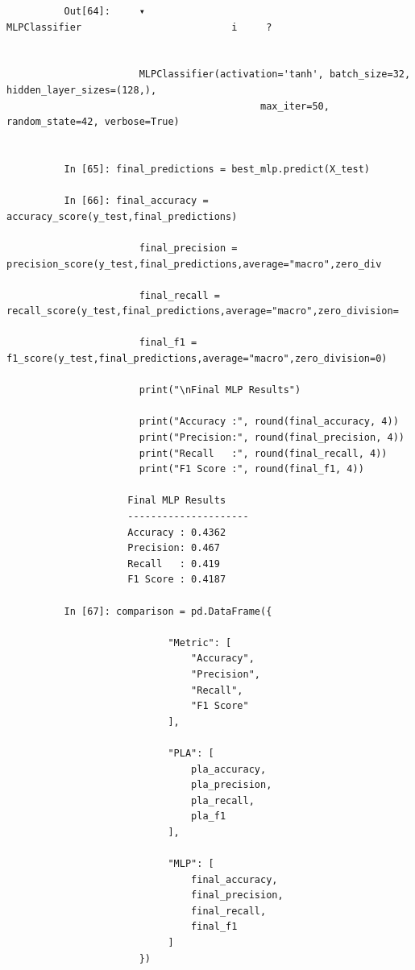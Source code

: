 \documentclass[12pt,a4paper]{article}
\begin{document}
\begin{lstlisting}
          Out[64]:     ▾                                  MLPClassifier                          i     ?


                       MLPClassifier(activation='tanh', batch_size=32, hidden_layer_sizes=(128,),
                                            max_iter=50, random_state=42, verbose=True)


          In [65]: final_predictions = best_mlp.predict(X_test)

          In [66]: final_accuracy = accuracy_score(y_test,final_predictions)

                       final_precision = precision_score(y_test,final_predictions,average="macro",zero_div

                       final_recall = recall_score(y_test,final_predictions,average="macro",zero_division=

                       final_f1 = f1_score(y_test,final_predictions,average="macro",zero_division=0)

                       print("\nFinal MLP Results")

                       print("Accuracy :", round(final_accuracy, 4))
                       print("Precision:", round(final_precision, 4))
                       print("Recall   :", round(final_recall, 4))
                       print("F1 Score :", round(final_f1, 4))

                     Final MLP Results
                     ---------------------
                     Accuracy : 0.4362
                     Precision: 0.467
                     Recall   : 0.419
                     F1 Score : 0.4187

          In [67]: comparison = pd.DataFrame({

                            "Metric": [
                                "Accuracy",
                                "Precision",
                                "Recall",
                                "F1 Score"
                            ],

                            "PLA": [
                                pla_accuracy,
                                pla_precision,
                                pla_recall,
                                pla_f1
                            ],

                            "MLP": [
                                final_accuracy,
                                final_precision,
                                final_recall,
                                final_f1
                            ]
                       })


\end{lstlisting}
\end{document}

